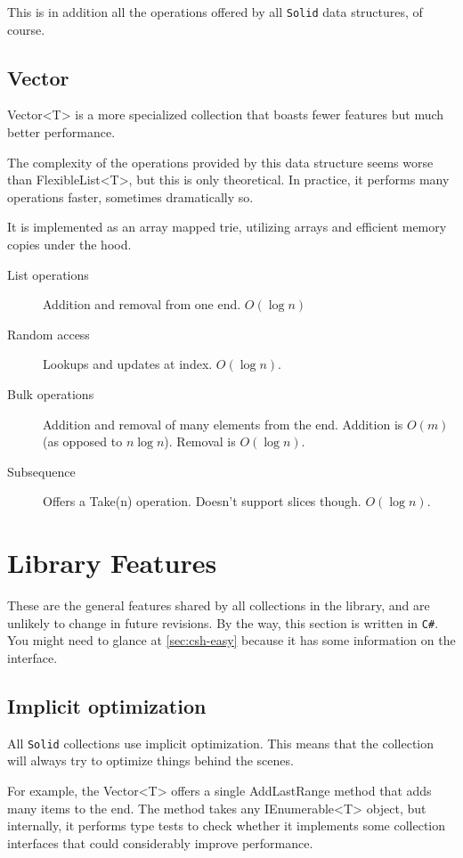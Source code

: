 \documentclass[]{article}
\newcommand{\codeformat}{\ttfamily}
\newcommand{\methodformat}{\codeformat\color{MidnightBlue}}
\newcommand{\interfaceformat}{\codeformat\color{ProcessBlue}}
\newcommand{\iface}[1]{{\interfaceformat #1}}
\newcommand{\method}[1]{{\methodformat #1}}
\newcommand{\solid}{\texttt{Solid}\xspace}
\newcommand{\csh}{\texttt{C\#}\xspace}
\begin{document}
This is in addition all the operations offered by all \solid data structures, of course. 

\subsection{Ve\relax ctor}\label{sec:vector}
Vector<T> is a more specialized collection that boasts fewer features but much better performance. 

The complexity of the operations provided by this data structure seems worse than FlexibleList<T>, but this is only theoretical. In practice, it performs many operations faster, sometimes dramatically so.

It is implemented as an array mapped trie, utilizing arrays and efficient memory copies under the hood. 
\begin{description}
	\item[List operations] Addition and removal from one end. $O(\log n)$
	\item[Random access] Lookups and updates at index. $O(\log n)$.
	\item[Bulk operations] Addition and removal of many elements from the end. Addition is $O(m)$ (as opposed to $n \log n$). Removal is $O(\log n)$.
	\item[Subsequence] Offers a \method{Take(n)} operation. Doesn't support slices though. $O(\log n)$.
\end{description}


\section{Library Features}\label{sec:library}
These are the general features shared by all collections in the library, and are unlikely to change in future revisions. By the way, this section is written in \csh. You might need to glance at \cref{sec:csh-easy} because it has some information on the interface.

\subsection{Implicit optimization}\label{sec:optimization}
All \solid collections use implicit optimization. This means that the collection will always try to optimize things behind the scenes.

For example, the Vector<T> offers a single AddLastRange method that adds many items to the end. The method takes any \iface{IEnumerable<T>} object, but internally, it performs type tests to check whether it implements some collection interfaces that could considerably improve performance. 
\end{document}
